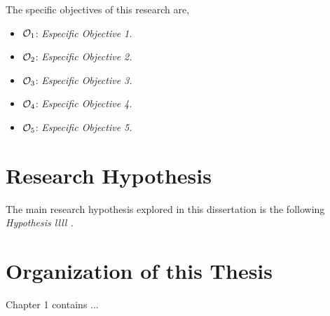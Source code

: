 The specific objectives of this research are,
\begin{itemize}
\item $\Large \mathcal{O}_1$: \emph{Especific Objective 1.}
\item $\Large \mathcal{O}_2$: \emph{Especific Objective 2.}
\item $\Large \mathcal{O}_3$: \emph{Especific Objective 3.}
\item $\Large \mathcal{O}_4$: \emph{Especific Objective 4.}
\item $\Large \mathcal{O}_5$: \emph{Especific Objective 5.}
\end{itemize}


\section{Research Hypothesis}


The main research hypothesis explored in this dissertation is the following \\

\textit{Hypothesis llll . }

\section{Organization of this Thesis}

Chapter 1 contains ...





